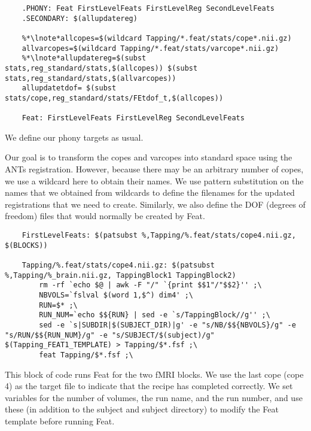 \begin{lstlisting}
	.PHONY: Feat FirstLevelFeats FirstLevelReg SecondLevelFeats
	.SECONDARY: $(allupdatereg)

	%*\lnote*allcopes=$(wildcard Tapping/*.feat/stats/cope*.nii.gz)
	allvarcopes=$(wildcard Tapping/*.feat/stats/varcope*.nii.gz)
	%*\lnote*allupdatereg=$(subst stats,reg_standard/stats,$(allcopes)) $(subst stats,reg_standard/stats,$(allvarcopes))
	allupdatetdof= $(subst stats/cope,reg_standard/stats/FEtdof_t,$(allcopes)) 

	Feat: FirstLevelFeats FirstLevelReg SecondLevelFeats
\end{lstlisting}
We define our phony targets as usual. 

Our goal is to transform the copes and varcopes into standard space
using the ANTs registration.  However, because there may be an
arbitrary number of copes, we use a wildcard here to obtain their
names.  We use pattern substitution on the names that we
obtained from wildcards to define the filenames for the updated
registrations that we need to create. Similarly, we also define the
DOF (degrees of freedom) files that would normally be created by Feat.


\begin{lstlisting}
	FirstLevelFeats: $(patsubst %,Tapping/%.feat/stats/cope4.nii.gz, $(BLOCKS))

	Tapping/%.feat/stats/cope4.nii.gz: $(patsubst %,Tapping/%_brain.nii.gz, TappingBlock1 TappingBlock2)
		rm -rf `echo $@ | awk -F "/" `{print $$1"/"$$2}'' ;\
		NBVOLS=`fslval $(word 1,$^) dim4' ;\
		RUN=$* ;\
		RUN_NUM=`echo $${RUN} | sed -e `s/TappingBlock//g'' ;\
		sed -e `s|SUBDIR|$(SUBJECT_DIR)|g' -e "s/NB/$${NBVOLS}/g" -e "s/RUN/$${RUN_NUM}/g" -e "s/SUBJECT/$(subject)/g" $(Tapping_FEAT1_TEMPLATE) > Tapping/$*.fsf ;\
		feat Tapping/$*.fsf ;\

\end{lstlisting}
This block of code runs Feat for the two fMRI blocks. We use the last
cope (cope 4) as the target file to indicate that the recipe has
completed correctly. We set variables for the number of volumes, the
run name, and the run number, and use these (in addition to the
subject and subject directory) to modify the Feat template before
running Feat.



